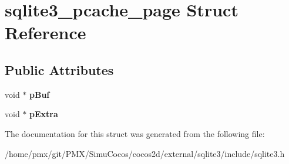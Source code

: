\hypertarget{structsqlite3__pcache__page}{}\section{sqlite3\+\_\+pcache\+\_\+page Struct Reference}
\label{structsqlite3__pcache__page}
\subsection*{Public Attributes}
\begin{DoxyCompactItemize}
\item 
\mbox{\label{structsqlite3__pcache__page_aa5446325077c05e4b242c8e2d0faba3b}} 
void $\ast$ {\bfseries p\+Buf}
\item 
\mbox{\label{structsqlite3__pcache__page_a96d7b0314d02837dd6a5e7057912f74f}} 
void $\ast$ {\bfseries p\+Extra}
\end{DoxyCompactItemize}


The documentation for this struct was generated from the following file\+:\begin{DoxyCompactItemize}
\item 
/home/pmx/git/\+P\+M\+X/\+Simu\+Cocos/cocos2d/external/sqlite3/include/sqlite3.\+h\end{DoxyCompactItemize}
